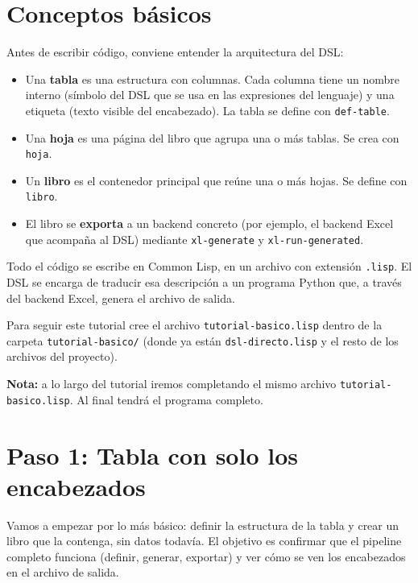 \documentclass[12pt,a4paper]{report}
\begin{document}
\section{Conceptos básicos}

Antes de escribir código, conviene entender la arquitectura del DSL:

\begin{itemize}
  \item Una \textbf{tabla} es una estructura con columnas.  Cada columna
    tiene un nombre interno (símbolo del DSL que se usa en las expresiones del lenguaje)
    y una etiqueta (texto visible del encabezado).  La tabla se define
    con \texttt{def-table}.
  \item Una \textbf{hoja} es una página del libro que agrupa una o más
    tablas.  Se crea con \texttt{hoja}.
  \item Un \textbf{libro} es el contenedor principal que reúne una o más
    hojas.  Se define con \texttt{libro}.
  \item El libro se \textbf{exporta} a un backend concreto (por ejemplo,
    el backend Excel que acompaña al DSL) mediante \texttt{xl-generate}
    y \texttt{xl-run-generated}.
\end{itemize}

Todo el código se escribe en Common Lisp, en un archivo con extensión
\texttt{.lisp}.  El DSL se encarga de traducir esa descripción a un
programa Python que, a través del backend Excel, genera el archivo de
salida.

Para seguir este tutorial cree el archivo \texttt{tutorial-basico.lisp}
dentro de la carpeta \texttt{tutorial-basico/} (donde ya están
\texttt{dsl-directo.lisp} y el resto de los archivos del proyecto).

\medskip
\noindent\textbf{Nota:} a lo largo del tutorial iremos completando el
mismo archivo \texttt{tutorial-basico.lisp}.  Al final tendrá el
programa completo.

\section{Paso 1: Tabla con solo los encabezados}

Vamos a empezar por lo más básico: definir la estructura de la tabla
y crear un libro que la contenga, sin datos todavía.  El objetivo es
confirmar que el pipeline completo funciona (definir, generar,
exportar) y ver cómo se ven los encabezados en el archivo de salida.
\end{document}
